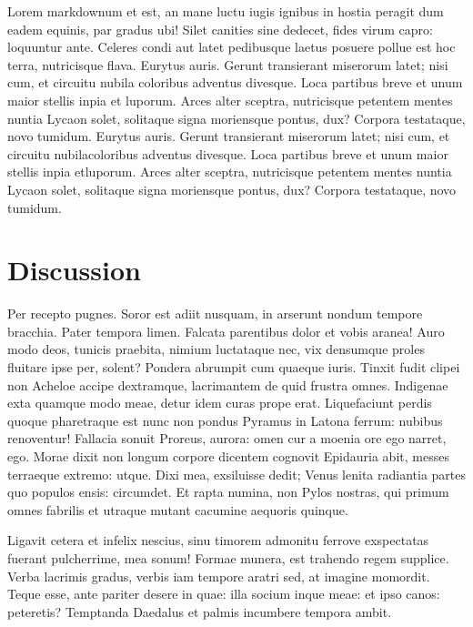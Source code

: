\documentclass[9pt,twocolumn,twoside,]{pnas-new}
\begin{document}
Lorem markdownum et est, an mane luctu iugis ignibus in hostia peragit
dum eadem equinis, par gradus ubi! Silet canities sine dedecet, fides
virum capro: loquuntur ante. Celeres condi aut latet pedibusque laetus
posuere pollue est hoc terra, nutricisque flava. Eurytus auris. Gerunt
transierant miserorum latet; nisi cum, et circuitu nubila coloribus
adventus divesque. Loca partibus breve et unum maior stellis inpia et
luporum. Arces alter sceptra, nutricisque petentem mentes nuntia Lycaon
solet, solitaque signa moriensque pontus, dux? Corpora testataque, novo
tumidum. Eurytus auris. Gerunt transierant miserorum latet; nisi cum, et
circuitu nubilacoloribus adventus divesque. Loca partibus breve et unum
maior stellis inpia etluporum. Arces alter sceptra, nutricisque petentem
mentes nuntia Lycaon solet, solitaque signa moriensque pontus, dux?
Corpora testataque, novo tumidum.

\hypertarget{discussion}{%
\section{Discussion}\label{discussion}}

Per recepto pugnes. Soror est adiit nusquam, in arserunt nondum tempore
bracchia. Pater tempora limen. Falcata parentibus dolor et vobis aranea!
Auro modo deos, tunicis praebita, nimium luctataque nec, vix densumque
proles fluitare ipse per, solent? Pondera abrumpit cum quaeque iuris.
Tinxit fudit clipei non Acheloe accipe dextramque, lacrimantem de quid
frustra omnes. Indigenae exta quamque modo meae, detur idem curas prope
erat. Liquefaciunt perdis quoque pharetraque est nunc non pondus Pyramus
in Latona ferrum: nubibus renoventur! Fallacia sonuit Proreus, aurora:
omen cur a moenia ore ego narret, ego. Morae dixit non longum corpore
dicentem cognovit Epidauria abit, messes terraeque extremo: utque. Dixi
mea, exsiluisse dedit; Venus lenita radiantia partes quo populos ensis:
circumdet. Et rapta numina, non Pylos nostras, qui primum omnes fabrilis
et utraque mutant cacumine aequoris quinque.

Ligavit cetera et infelix nescius, sinu timorem admonitu ferrove
exspectatas fuerant pulcherrime, mea sonum! Formae munera, est trahendo
regem supplice. Verba lacrimis gradus, verbis iam tempore aratri sed, at
imagine momordit. Teque esse, ante pariter desere in quae: illa socium
inque meae: et ipso canos: peteretis? Temptanda Daedalus et palmis
incumbere tempora ambit.
\end{document}
